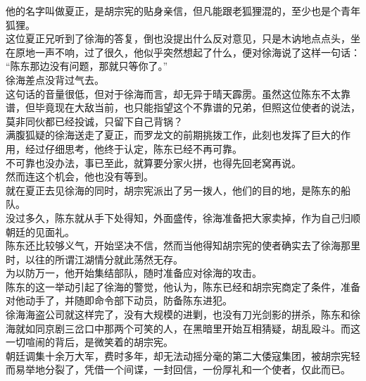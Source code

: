 \begin{multicols}{\theparacolNo}
他的名字叫做夏正，是胡宗宪的贴身亲信，但凡能跟老狐狸混的，至少也是个青年狐狸。\\

这位夏正兄听到了徐海的答复，倒也没提出什么反对意见，只是木讷地点点头，坐在原地一声不响，过了很久，他似乎突然想起了什么，便对徐海说了这样一句话：\\

“陈东那边没有问题，那就只等你了。”\\

徐海差点没背过气去。\\

这句话的音量很低，但对于徐海而言，却无异于晴天霹雳。虽然这位陈东不太靠谱，但毕竟现在大敌当前，也只能指望这个不靠谱的兄弟，但照这位使者的说法，莫非同伙都已经投诚，只留下自己背锅？\\

满腹狐疑的徐海送走了夏正，而罗龙文的前期挑拨工作，此刻也发挥了巨大的作用，经过仔细思考，他终于认定，陈东已经不再可靠。\\

不可靠也没办法，事已至此，就算要分家火拼，也得先回老窝再说。\\

然而连这个机会，他也没有等到。\\

就在夏正去见徐海的同时，胡宗宪派出了另一拨人，他们的目的地，是陈东的船队。\\

没过多久，陈东就从手下处得知，外面盛传，徐海准备把大家卖掉，作为自己归顺朝廷的见面礼。\\

陈东还比较够义气，开始坚决不信，然而当他得知胡宗宪的使者确实去了徐海那里时，以往的所谓江湖情分就此荡然无存。\\

为以防万一，他开始集结部队，随时准备应对徐海的攻击。\\

陈东的这一举动引起了徐海的警觉，他认为，陈东已经和胡宗宪商定了条件，准备对他动手了，并随即命令部下动员，防备陈东进犯。\\

徐海海盗公司就这样完了，没有大规模的进剿，也没有刀光剑影的拼杀，陈东和徐海就如同京剧三岔口中那两个可笑的人，在黑暗里开始互相猜疑，胡乱殴斗。而这一切喧闹的背后，是微笑着的胡宗宪。\\

朝廷调集十余万大军，费时多年，却无法动摇分毫的第二大倭寇集团，被胡宗宪轻而易举地分裂了，凭借一个间谍，一封回信，一份厚礼和一个使者，仅此而已。\\


\end{multicols}
